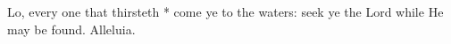 Lo, every one that thirsteth * come ye to the waters: seek ye the Lord while He may be found. Alleluia.
